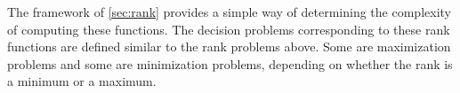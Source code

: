 The framework of \autoref{sec:rank} provides a simple way of determining the complexity of computing these functions.
The decision problems corresponding to these rank functions are defined similar to the rank problems above.
Some are maximization problems and some are minimization problems, depending on whether the rank is a minimum or a maximum.

